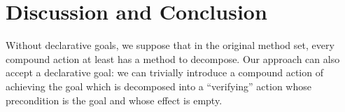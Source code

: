 \documentclass[letterpaper]{article} %
\begin{document}


\section{Discussion and Conclusion}
Without declarative goals,
we suppose that in the original method set, every compound action at least has a method to decompose.
Our approach can also accept a declarative goal: we can trivially introduce a compound action of achieving the goal which is decomposed into a ``verifying'' action whose precondition is the goal and whose effect is empty.
\end{document}

